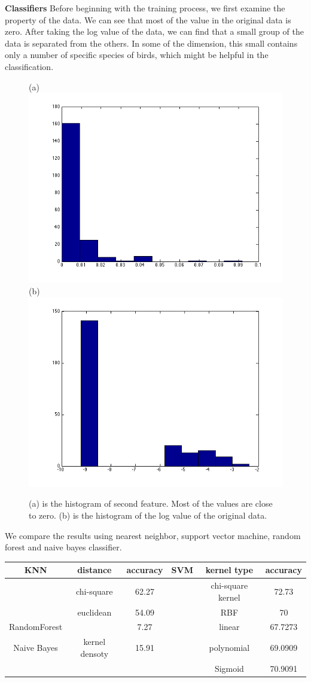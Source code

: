 \documentclass{article} %
\begin{document}
\textbf{Classifiers}
Before beginning with the training process, we first examine the property of the data. We can see that most of the value in the original data is zero. After taking the log value of the data, we can find that a small group of the data is separated from the others. In some of the dimension, this small contains only a number of specific species of birds, which might be helpful in the classification.
\begin{figure}[ht!]
    \centering
    {(a)\includegraphics[width=0.45\linewidth]{../Figure/Train_features.png}
    (b)\includegraphics[width=0.45\linewidth]{../Figure/Train_features_log.png}}
    \caption{(a) is the histogram of second feature. Most of the values are close to zero. (b) is the histogram of the log value of the original data.}
    \label{fig:hist}
\end{figure}


We compare the results using nearest neighbor, support vector machine, random forest and naive bayes classifier.


\begin{center}
\begin{small}
\begin{tabular}{|c|c|c|c|c|c|}
\hline
    KNN & distance      &accuracy   &SVM    & kernel type       &accuracy\\
\hline
        & chi-square    &62.27      &       &chi-square kernel  &72.73\\
\hline
        & euclidean     &54.09      &       & RBF               &70\\
\hline
RandomForest &         & 7.27           &       & linear            &67.7273\\
\hline
Naive Bayes  & kernel densoty  & 15.91           &       & polynomial        &69.0909\\
\hline
        &               &           &       & Sigmoid           &70.9091\\
\hline
\end{tabular}
\end{small}
\end{center}
\end{document}
